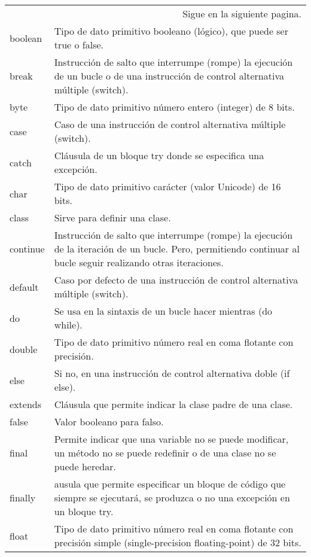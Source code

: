 \documentclass[12pt, A4]{article}
\begin{document}
{{{\begin{longtable}[h]{p{3cm} p{10cm}}
		\multicolumn{2}{r}{Sigue en la siguiente pagina.}
		\endfoot
		
		\endlastfoot
		
				\rowcolor{gray!20}	abstract	& Se utiliza para definir clases y métodos abstractos.\\
					boolean	& Tipo de dato primitivo booleano (lógico), que puede ser true o false.\\ 
					\rowcolor{gray!20}	break	& Instrucción de salto que interrumpe (rompe) la ejecución de un bucle o de una instrucción de control alternativa múltiple (switch).\\
					byte	&  Tipo de dato primitivo n\'umero entero (integer) de 8 bits.\\
					\rowcolor{gray!20}	case	& Caso de una instrucción de control alternativa múltiple (switch).\\
					catch	& Cl\'ausula de un bloque try donde se especifica una excepción.\\
					\rowcolor{gray!20}	char	& Tipo de dato primitivo carácter (valor Unicode) de 16 bits.\\
					class	& Sirve para definir una clase.\\
					\rowcolor{gray!20}	continue & Instrucción de salto que interrumpe (rompe) la ejecución de la iteración de un bucle. Pero, permitiendo continuar al bucle seguir realizando otras iteraciones.\\
					default	& Caso por defecto de una instrucción de control alternativa múltiple (switch).\\
						\rowcolor{gray!20} do	& Se usa en la sintaxis de un bucle hacer mientras (do while).\\
					double	& Tipo de dato primitivo número real en coma flotante con precisión.\\
					\rowcolor{gray!20}	else	& Si no, en una instrucción de control alternativa doble (if else).\\
					extends	& Cláusula que permite indicar la clase padre de una clase.\\
					\rowcolor{gray!20}	false	&   Valor booleano para falso.\\
					final	& Permite indicar que una variable no se puede modificar, un método no se puede redefinir o de una clase no se puede heredar.\\
						\rowcolor{gray!20} finally		& ausula que permite especificar un bloque de código que siempre se ejecutará, se produzca o no una excepción en un bloque try.\\
					float	& Tipo de dato primitivo número real en coma flotante con precisión simple (single-precision floating-point) de 32 bits.\\

\end{longtable}}}}
\end{document}
